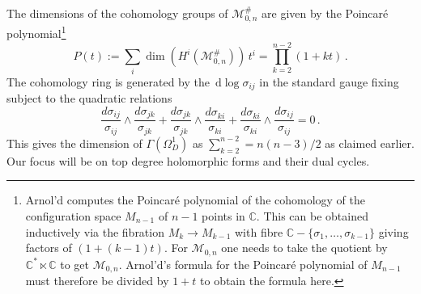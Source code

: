 \documentclass[11pt]{article}
\newcommand{\C}{\mathbb{C}}
\newcommand{\cM}{\mathcal{M}}
\newcommand{\rd}{\, \mathrm{d}}
\newcommand{\1}{{\rm 1\hskip-0.25em I}}
\begin{document}
The dimensions of the cohomology groups of $\cM_{0,n}^\#$
are given by  the Poincar\'e polynomial\footnote{Arnol'd \cite{Arnold}
computes the Poincar\'e polynomial of the cohomology of the configuration space $M_{n-1}$ of $n-1$ points in $\C$.  This can be obtained inductively via  the fibration $M_{k}\rightarrow M_{k-1}$ with fibre $\C-\{\sigma_1,\ldots,\sigma_{k-1}\}$ giving factors of $(1+(k-1)t)$. For $\cM_{0,n}$ one needs to take the quotient by $\C^*\ltimes \C$ to get $\cM_{0,n}$.   Arnol'd's formula for the Poincar\'e polynomial of $M_{n-1}$  must therefore be divided  by $1+t$ to obtain the formula here.}  
\begin{equation}
P(t) :=\sum_i \dim (H^i(\cM^\#_{0,n}))\,t^i=\prod_{k=2}^{n-2} (1+kt)\, .
\end{equation}
The cohomology ring is generated by the $\rd \log \sigma_{ij}$ in the standard gauge fixing subject to the quadratic relations 
\begin{equation}
\frac{d\sigma_{ij}}{\sigma_{ij}} \wedge \frac{d \sigma_{jk}}{\sigma_{jk}} +
\frac{d\sigma_{jk}}{\sigma_{jk}} \wedge \frac{d\sigma_{ki}}{\sigma_{ki}} +
\frac{d\sigma_{ki}}{\sigma_{ki}} \wedge \frac{d\sigma_{ij}}{\sigma_{ij}} =0\, . \label{schouten}
\end{equation}
This gives the dimension of $\Gamma(\Omega_D^1)$ as $\sum_{k=2}^{n-2}=n(n-3)/2$ as claimed earlier. Our focus will be on  top degree holomorphic forms and their dual cycles.  
\end{document}
